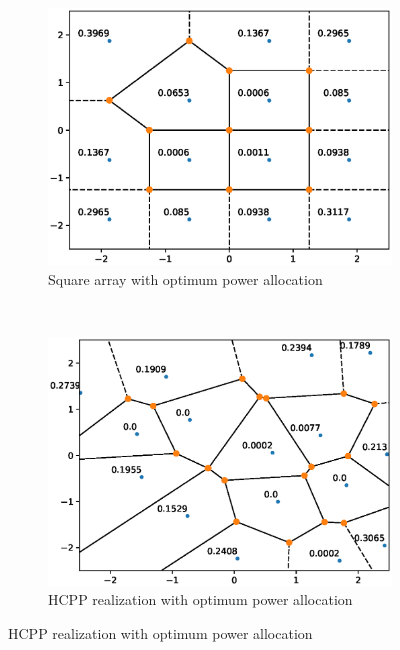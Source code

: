 \documentclass[slidestop,usepdftitle=false]{gvvslides}
\begin{document}
\begin{frame}
\begin{figure}[!]
\centering
\begin{subfigure}{0.5\columnwidth}
\includegraphics[width=\columnwidth]{sqarr_pwr}
\caption{Square array with optimum power allocation}
\end{subfigure}~
\begin{subfigure}{0.485\columnwidth}
\includegraphics[width=\columnwidth]{hcpp_pwr}
\caption{HCPP realization with optimum power allocation}
\end{subfigure}
\label{fig:SNR_profiles}
\end{figure}
\end{frame}
\end{document}
